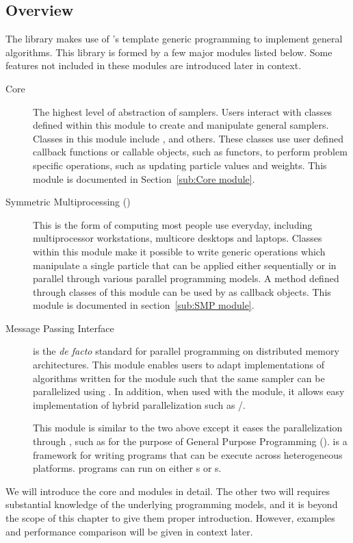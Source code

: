\subsection{Overview}

The \vsmc library makes use of \cpp's template generic programming to
implement general \smc algorithms. This library is formed by a few major
modules listed below. Some features not included in these modules are
introduced later in context.
\begin{description}
  \item[Core] The highest level of abstraction of \smc samplers. Users
    interact with classes defined within this module to create and manipulate
    general \smc samplers. Classes in this module include ,
     and others. These classes use user defined callback
    functions or callable objects, such as functors, to perform problem
    specific operations, such as updating particle values and weights. This
    module is documented in Section~\ref{sub:Core module}.
  \item[Symmetric Multiprocessing (\smp)] This is the form of computing most
    people use everyday, including multiprocessor workstations, multicore
    desktops and laptops. Classes within this module make it possible to write
    generic operations which manipulate a single particle that can be applied
    either sequentially or in parallel through various parallel programming
    models. A method defined through classes of this module can be used by
     as callback objects. This module is documented in
    section~\ref{sub:SMP module}.
  \item[Message Passing Interface] \mpi is the \emph{de facto} standard for
    parallel programming on distributed memory architectures. This module
    enables users to adapt implementations of algorithms written for the \smp
    module such that the same sampler can be parallelized using \mpi. In
    addition, when used with the \smp module, it allows easy implementation of
    hybrid parallelization such as \mpi/\openmp.
  \item[\opencl] This module is similar to the two above except it eases the
    parallelization through \opencl, such as for the purpose of General
    Purpose \gpu Programming (\gpgpu). \opencl is a framework for writing
    programs that can be execute across heterogeneous platforms. \opencl
    programs can run on either \cpu{}s or \gpu{}s.
\end{description}
We will introduce the core and \smp modules in detail. The other two will
requires substantial knowledge of the underlying programming models, and it is
beyond the scope of this chapter to give them proper introduction. However,
examples and performance comparison will be given in context later.

